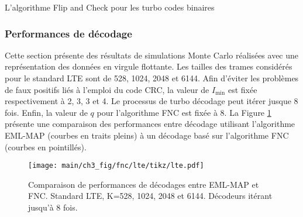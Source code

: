 \begin{center}
\begin{minipage}{.86\textwidth}%
\begin{algorithm}[H]
\label{alg:fc_b}
	\DontPrintSemicolon
	
	\;
	\caption{L'algorithme Flip and Check pour les turbo codes binaires}
\end{algorithm}
\end{minipage}
\end{center}



\subsubsection{Performances de décodage}
Cette section présente des résultats de simulations Monte Carlo réalisées avec une représentation des données en 
virgule flottante.
Les tailles des trames considérés pour le standard LTE sont de 528, 1024, 2048 et 6144. Afin d'éviter les problèmes de
faux positifs liés à l'emploi du code CRC, la valeur de $I_\text{min}$ est fixée respectivement à 2, 3, 3 et 4. Le processus
de turbo décodage peut itérer jusque 8 fois. Enfin, la valeur de $q$ pour l'algorithme FNC est fixée à 8. La Figure 
\ref{fig:fnc_lte} présente une comparaison des performances entre décodage utilisant l'algorithme EML-MAP (courbes en 
traits pleins) à un décodage basé sur l'algorithme FNC (courbes en pointillés).

\begin{figure}[!htb]
	\centering
	\texttt{[image: main/ch3\_fig/fnc/lte/tikz/lte.pdf]}
	\caption{Comparaison de performances de décodages entre EML-MAP et FNC. Standard LTE, K=528, 1024, 2048 et 6144.
	Décodeurs itérant jusqu'à 8 fois. \label{fig:fnc_lte}}
\end{figure}


